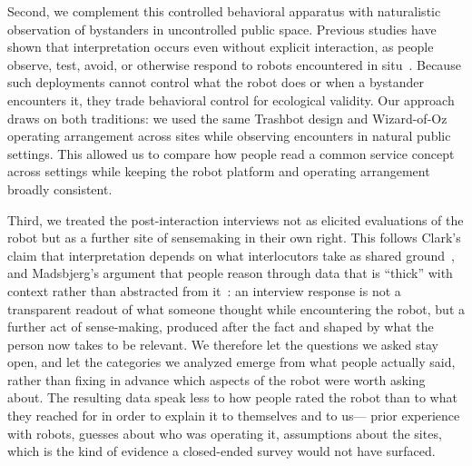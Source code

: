 Second, we complement this controlled behavioral apparatus with naturalistic observation of bystanders in uncontrolled public space. Previous studies have shown that interpretation occurs even without explicit interaction, as people observe, test, avoid, or otherwise respond to robots encountered in situ~\cite{pelikan2024encountering, sabanovic2006robots}. Because such deployments cannot control what the robot does or when a bystander encounters it, they trade behavioral control for ecological validity. Our approach draws on both traditions: we used the same Trashbot design and Wizard-of-Oz operating arrangement across sites while observing encounters in natural public settings. This allowed us to compare how people read a common service concept across settings while keeping the robot platform and operating arrangement broadly consistent.
  
Third, we treated the post-interaction interviews not as elicited evaluations of the robot but as a further site of sensemaking in their own right. This follows Clark's claim that interpretation depends on what interlocutors take as shared ground~\cite{clark1996using}, and Madsbjerg's argument that people reason through data that is ``thick'' with context rather than abstracted from it~\cite{madsbjerg2017sensemaking}: an interview response is not a transparent readout of what someone thought while encountering the robot, but a further act of sense-making, produced after the fact and shaped by what the person now takes to be relevant. We therefore let the questions we asked stay open, and let the categories we analyzed emerge from what people actually said, rather than fixing in advance which aspects of the robot were worth asking about. The resulting data speak less to how people rated the robot than to what they reached for in order to explain it to themselves and to us--- prior experience with robots, guesses about who was operating it, assumptions about the sites, which is the kind of evidence a closed-ended survey would not have surfaced.
  
